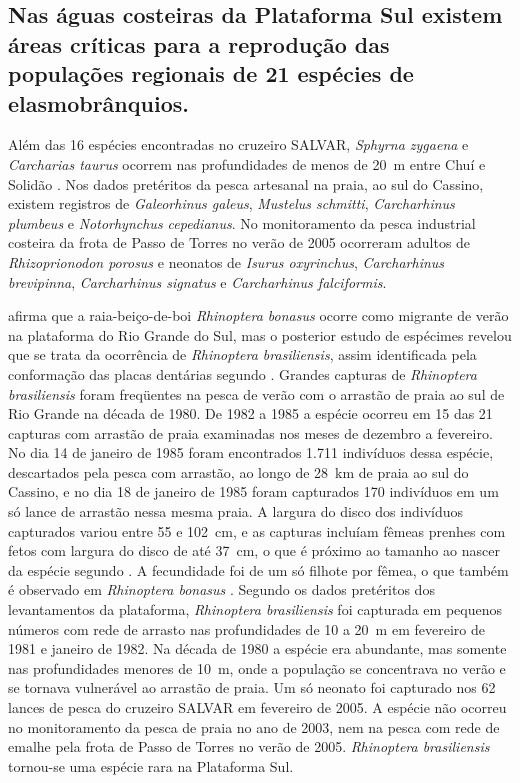 \documentclass[a4paper,11pt,twoside,showtrims,onecolumn,openright,final]{memoir}
\begin{document}

\subsection*{Nas águas costeiras da Plataforma Sul existem áreas críticas para a 
             reprodução das populações regionais de 21 espécies de elasmobrânquios.}

Além das 16 espécies encontradas no cruzeiro SALVAR, \emph{Sphyrna zygaena} e \emph{Carcharias taurus} ocorrem 
nas profundidades de menos de 20~m entre Chuí e Solidão \citep{vooren1997}. %
Nos dados pretéritos da pesca artesanal na praia, ao sul do Cassino, existem registros 
de \emph{Galeorhinus galeus}, \emph{Mustelus schmitti}, \emph{Carcharhinus plumbeus} e \emph{Notorhynchus cepedianus}.
No monitoramento da pesca industrial costeira da frota de Passo de Torres no verão de 2005 ocorreram adultos 
de \emph{Rhizoprionodon porosus} e neonatos de \emph{Isurus oxyrinchus}, \emph{Carcharhinus brevipinna}, 
\emph{Carcharhinus signatus} e \emph{Carcharhinus falciformis}.

\citet{vooren1997} afirma que a raia-beiço-de-boi \emph{Rhinoptera bonasus} ocorre como migrante 
de verão na plataforma do Rio Grande do Sul, mas o posterior estudo de espécimes revelou que 
se trata da ocorrência de \emph{Rhinoptera brasiliensis}, assim identificada pela conformação das placas 
dentárias segundo \citet{bigelow1953}. %
Grandes capturas de \emph{Rhinoptera brasiliensis} foram freqüentes na pesca de verão com o arrastão de praia 
ao sul de Rio Grande na década de 1980. De 1982 a 1985 a espécie ocorreu em 15 das 21 capturas 
com arrastão de praia examinadas nos meses de dezembro a fevereiro. No dia 14 de janeiro de 1985 
foram encontrados 1.711 indivíduos dessa espécie, descartados pela pesca com arrastão, ao longo de 28~km 
de praia ao sul do Cassino, e no dia 18 de janeiro de 1985 foram capturados 170 indivíduos em um só lance 
de arrastão nessa mesma praia. A largura do disco dos indivíduos capturados variou entre 55 e 102~cm, 
e as capturas incluíam fêmeas prenhes com fetos com largura do disco de até 37~cm, o que é próximo 
ao tamanho ao nascer da espécie segundo \citet{bigelow1953}. %
A fecundidade foi de um só filhote por fêmea, o que também é observado 
em \emph{Rhinoptera bonasus} \citep{smith1986}. %
Segundo os dados pretéritos dos levantamentos da plataforma, \emph{Rhinoptera brasiliensis} 
foi capturada em pequenos números com rede de arrasto nas profundidades de 10 a 20~m  
em fevereiro de 1981 e janeiro de 1982. Na década de 1980 a espécie era abundante, mas somente 
nas profundidades menores de 10~m, onde a população se concentrava no verão e se tornava vulnerável 
ao arrastão de praia. Um só neonato foi capturado nos 62 lances de pesca do cruzeiro SALVAR 
em fevereiro de 2005. A espécie não ocorreu no monitoramento da pesca de praia no ano de 2003, 
nem na pesca com rede de emalhe pela frota de Passo de Torres no verão de 2005. 
\emph{Rhinoptera brasiliensis} tornou-se uma espécie rara na Plataforma Sul. 
\end{document}
